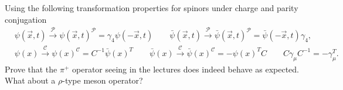 Using the following transformation properties for spinors under charge and parity conjugation
\begin{equation*}
\begin{aligned}
& \psi\left(\vec{x} , t\right) \xrightarrow{\mathcal{P}} \psi\left(\vec{x} , t\right)^{\mathcal{P}}=\gamma_4 \psi\left(-\vec{x} , t\right)  \quad\quad \bar{\psi}\left(\vec{x} , t\right) \xrightarrow{\mathcal{P}} \bar{\psi}\left(\vec{x} , t\right)^{\mathcal{P}}=\bar{\psi}\left(-\vec{x} , t\right) \gamma_4,
\end{aligned}
\end{equation*}
\begin{equation*}
\begin{aligned}
& \psi(x) \xrightarrow{\mathcal{C}} \psi(x)^{\mathcal{C}}=C^{-1} \bar{\psi}(x)^T  \quad \quad \bar{\psi}(x) \xrightarrow{\mathcal{C}} \bar{\psi}(x)^{\mathcal{C}}=-\psi(x)^T C \quad\quad C \gamma_\mu C^{-1}=-\gamma_\mu^T.
\end{aligned}
\end{equation*}
Prove that the $\pi^+$ operator seeing in the lectures does indeed behave as expected. What about a $\rho$-type meson operator? \\
